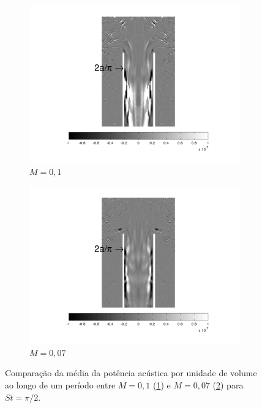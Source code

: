 \begin{figure}[ht!]
\begin{subfigure}{0.5\textwidth}
  \centering
  \includegraphics[width=1.1\linewidth]{figuras/max_01_media.png}
  \caption{$M = 0,1$}
  \label{fig:comparacao_01}
\end{subfigure}%
\begin{subfigure}{0.5\textwidth}
  \centering
  \includegraphics[width=1.1\linewidth]{figuras/max_007_media.png}
  \caption{$M = 0,07$}
  \label{fig:comparacao_007}
\end{subfigure}
\caption[Comparação da média da potência acústica por unidade de volume ao longo de um período entre $M = 0,1$ e $M = 0,07$ para $St = \pi/2.$]{Comparação da média da potência acústica por unidade de volume ao longo de um período entre $M = 0,1$ (\ref{fig:comparacao_01}) e $M = 0,07$ (\ref{fig:comparacao_007}) para $St = \pi/2.$}
\label{fig:comparacao_007_01}
\end{figure}

